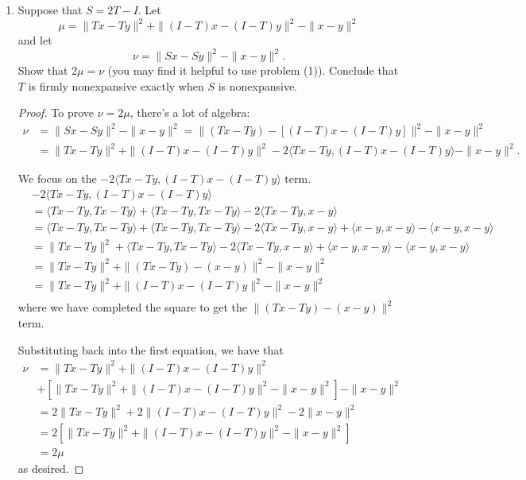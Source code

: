 \documentclass[11pt]{amsart}
\begin{document}
\begin{enumerate}
\begin{enumerate}
\item Suppose that $S = 2T - I$. Let 
\[
\mu = \|Tx - Ty\|^2 + \|(I-T)x - (I-T)y\|^2 - \|x-y\|^2
\]
and let 
\[
\nu = \|Sx - Sy\|^2 - \|x-y\|^2.
\]
Show that $2\mu = \nu$ (you may find it helpful to use problem (1)). Conclude that 
$T$ is firmly nonexpansive exactly when $S$ is nonexpansive.

\begin{proof}
  To prove $\nu = 2\mu$, there's a lot of algebra:
  \begin{align*}
    \nu &=\|Sx - Sy\|^2 - \|x-y\|^2
    = \|(Tx - Ty) - [(I - T)x - (I - T)y]\|^2  - \|x-y\|^2 \\    
    &= \|Tx - Ty\|^2 + \|(I - T)x - (I - T)y\|^2
      - 2\langle Tx - Ty, (I - T)x - (I - T)y\rangle - \|x-y\|^2.
  \end{align*}

  We focus on the $-2\langle Tx - Ty, (I - T)x - (I - T)y\rangle$ term.
  \begin{align*}
    &-2\langle Tx - Ty, (I - T)x - (I - T)y\rangle \\
    &= \langle Tx - Ty, Tx - Ty \rangle + \langle Tx - Ty, Tx - Ty \rangle
      - 2\langle Tx - Ty, x - y \rangle \\
    &= \langle Tx - Ty, Tx - Ty \rangle + \langle Tx - Ty, Tx - Ty \rangle
      - 2\langle Tx - Ty, x - y \rangle + \langle x - y, x - y \rangle - \langle x - y, x - y \rangle \\
    &= \| Tx - Ty \|^2 + \langle Tx - Ty, Tx - Ty \rangle
      - 2\langle Tx - Ty, x - y \rangle + \langle x - y, x - y \rangle - \langle x - y, x - y \rangle \\
    &= \| Tx - Ty \|^2 + \| (Tx - Ty) - (x-y) \|^2 - \| x - y \|^2 \\
    &= \| Tx - Ty \|^2 + \| (I - T)x - (I- T)y\|^2 - \| x - y \|^2 \\
  \end{align*}
  where we have completed the square to get the $\| (Tx - Ty) - (x-y) \|^2$
  term.

  Substituting back into the first equation, we have that
  \begin{align*}
    \nu
    &= \|Tx - Ty\|^2 + \|(I - T)x - (I - T)y\|^2 \\
    &+ \left[\| Tx - Ty \|^2 + \| (I - T)x - (I- T)y\|^2 - \| x - y \|^2\right] - \|x-y\|^2 \\
    &= 2\|Tx - Ty\|^2 + 2\|(I - T)x - (I - T)y\|^2 - 2\| x - y \|^2 \\
    &= 2\left[\|Tx - Ty\|^2 + \|(I - T)x - (I - T)y\|^2 - \| x - y \|^2\right] \\
    &= 2\mu
  \end{align*}
  as desired.


\end{proof}
\end{enumerate}
\end{enumerate}
\end{document}
